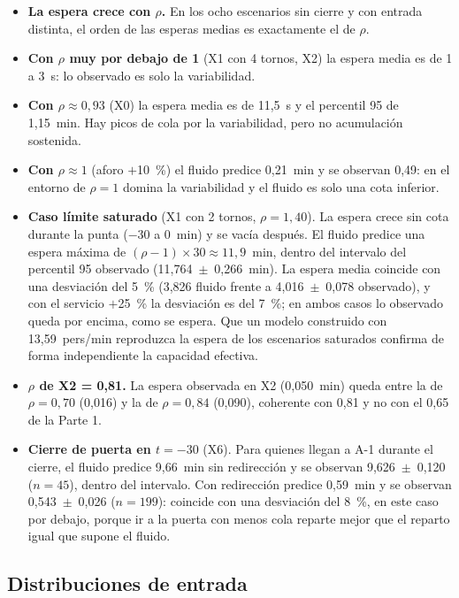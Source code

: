 \begin{itemize}
  \item \textbf{La espera crece con $\rho$.} En los ocho escenarios sin cierre y
    con entrada distinta, el orden de las esperas medias es exactamente el de
    $\rho$.
  \item \textbf{Con $\rho$ muy por debajo de 1} (X1 con 4 tornos, X2) la espera
    media es de 1 a 3~s: lo observado es solo la variabilidad.
  \item \textbf{Con $\rho \approx 0{,}93$} (X0) la espera media es de 11,5~s y el
    percentil 95 de 1,15~min. Hay picos de cola por la variabilidad, pero no
    acumulación sostenida.
  \item \textbf{Con $\rho \approx 1$} (aforo $+$10~\%) el fluido predice
    0,21~min y se observan 0,49: en el entorno de $\rho=1$ domina la variabilidad
    y el fluido es solo una cota inferior.
  \item \textbf{Caso límite saturado} (X1 con 2 tornos, $\rho=1{,}40$). La espera
    crece sin cota durante la punta ($-30$ a 0~min) y se vacía después. El fluido
    predice una espera máxima de $(\rho-1)\times 30 \approx 11{,}9$~min, dentro del
    intervalo del percentil 95 observado (11,764~$\pm$~0,266~min). La espera media
    coincide con una desviación del 5~\% (3,826 fluido frente a
    4,016~$\pm$~0,078 observado), y con el servicio $+$25~\% la desviación es
    del 7~\%; en ambos casos lo observado queda por encima, como se espera.
    Que un modelo construido con 13,59~pers/min reproduzca la espera de los
    escenarios saturados confirma de forma independiente la capacidad efectiva.
  \item \textbf{$\rho$ de X2 = 0,81.} La espera observada en X2 (0,050~min) queda
    entre la de $\rho=0{,}70$ (0,016) y la de $\rho=0{,}84$ (0,090), coherente con
    0,81 y no con el 0,65 de la Parte 1.
  \item \textbf{Cierre de puerta en $t=-30$} (X6). Para quienes llegan a A-1
    durante el cierre, el fluido predice 9,66~min sin redirección y se observan
    9,626~$\pm$~0,120 ($n=45$), dentro del intervalo. Con redirección predice
    0,59~min y se observan 0,543~$\pm$~0,026 ($n=199$): coincide con una
    desviación del 8~\%, en este caso por debajo, porque ir a la puerta con menos
    cola reparte mejor que el reparto igual que supone el fluido.
\end{itemize}

\subsection{Distribuciones de entrada}

